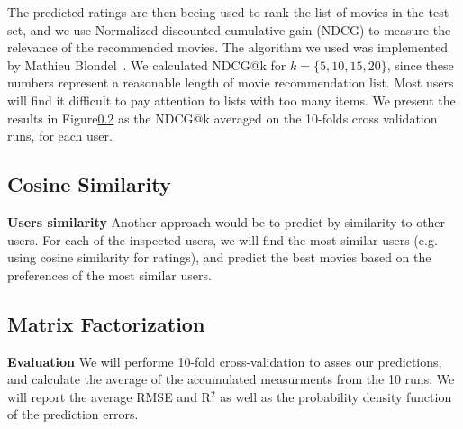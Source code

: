 The predicted ratings are then beeing used to rank the list of movies in the test set, and we use Normalized discounted cumulative gain (NDCG) to measure the relevance of the recommended movies. The algorithm we used was implemented by Mathieu Blondel~\cite{letorMetrics}. We calculated NDCG@k for $k=\{5, 10, 15, 20\}$, since these numbers represent a reasonable length of movie recommendation list. Most users will find it difficult to pay attention to lists with too many items. We present the results in Figure\ref{} as the NDCG@k averaged on the 10-folds cross validation runs, for each user.


\subsection{Cosine Similarity}

\textbf{Users similarity}
Another approach would be to predict by similarity to other users. For each of the inspected users, we will find the most similar users (e.g. using cosine similarity for ratings), and predict the best movies based on the preferences of the most similar users.


\subsection{Matrix Factorization}

\textbf{Evaluation}
We will performe 10-fold cross-validation to asses our predictions, and calculate the average of the accumulated measurments from the 10 runs. We will report the average RMSE and R$^2$ as well as the probability density function of the prediction errors.

